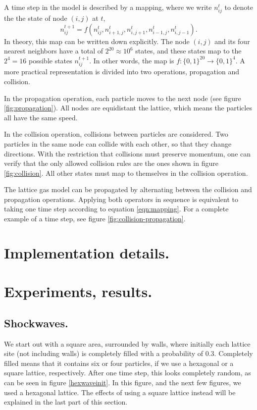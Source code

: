 \documentclass[12pt,a4paper]{article}
\begin{document}
A time step in the model is described by a mapping, where we write $n_{ij}^t$ to denote the the state of node $(i,j)$ at $t$,
\begin{equation}\label{eqn:mapping}
n^{t+1}_{ij} = f(n^t_{ij}, n^t_{i+1,j}, n^t_{i,j+1}, n^t_{i-1,j}, n^t_{i,j-1}).
\end{equation}
In theory, this map can be written down explicitly. The node $(i,j)$ and its four nearest neighbors have a total of $2^{20}\approx 10^6$ states, and these states map to the $2^4=16$ possible states $n^{t+1}_{ij}$. In other words, the map is
$
f: \{0,1\}^{20} \longrightarrow \{0,1\}^4.
$
A more practical representation is divided into two operations, propagation and collision. 

In the propagation operation, each particle moves to the next node (see figure \ref{fig:propagation}). All nodes are equidistant the lattice, which means the particles all have the same speed.

In the collision operation, collisions between particles are considered. Two particles in the same node can collide with each other, so that they change directions. With the restriction that collisions must preserve momentum, one can verify that the only allowed collision rules are the ones shown in figure \ref{fig:collision}. All other states must map to themselves in the collision operation.

The lattice gas model can be propagated by alternating between the collision and propagation operations. Applying both operators in sequence is equivalent to taking one time step according to equation \eqref{eqn:mapping}. For a complete example of a time step, see figure \ref{fig:collision-propagation}.


\section{Implementation details.}

\section{Experiments, results.}
\subsection{Shockwaves.}
We start out with a square area, surrounded by walls, where initially each lattice site (not including walls)
is completely filled with a probability of 0.3. Completely filled means that it contains six or
four particles, if we use a hexagonal or a square lattice, respectively. After one time step,
this looks completely random, as can be seen in figure \ref{hexwaveinit}. In this figure, and the
next few figures, we used a hexagonal lattice. The effects of using a square lattice instead will be
explained in the last part of this section.
\end{document}
